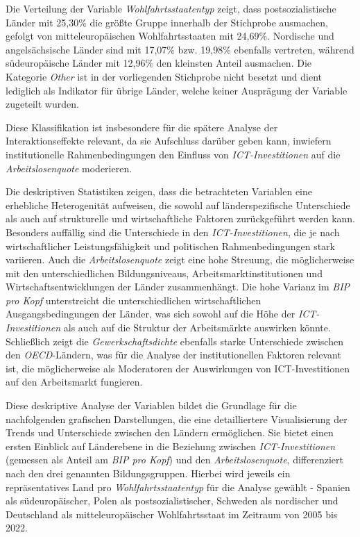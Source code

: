 

Die Verteilung der Variable \textit{Wohlfahrtsstaatentyp} zeigt, dass postsozialistische Länder 
mit 25,30\% die größte Gruppe innerhalb der Stichprobe ausmachen, gefolgt von mitteleuropäischen 
Wohlfahrtsstaaten mit 24,69\%. Nordische und angelsächsische Länder sind mit 17,07\% bzw. 19,98\% 
ebenfalls vertreten, während südeuropäische Länder mit 12,96\% den kleinsten Anteil ausmachen. 
Die Kategorie \textit{Other} ist in der vorliegenden Stichprobe nicht besetzt und dient lediglich 
als Indikator für übrige Länder, welche keiner Ausprägung der Variable zugeteilt wurden.

Diese Klassifikation ist insbesondere für die spätere Analyse der Interaktionseffekte relevant, 
da sie Aufschluss darüber geben kann, inwiefern institutionelle Rahmenbedingungen den Einfluss 
von \textit{\ac{ICT}-Investitionen} auf die \textit{Arbeitslosenquote} moderieren.

Die deskriptiven Statistiken zeigen, dass die betrachteten Variablen eine erhebliche 
Heterogenität aufweisen, die sowohl auf länderspezifische Unterschiede als auch auf strukturelle 
und wirtschaftliche Faktoren zurückgeführt werden kann. Besonders auffällig sind die Unterschiede 
in den \textit{\ac{ICT}-Investitionen}, die je nach wirtschaftlicher Leistungsfähigkeit und 
politischen Rahmenbedingungen stark variieren. Auch die \textit{Arbeitslosenquote} zeigt eine 
hohe Streuung, die möglicherweise mit den unterschiedlichen Bildungsniveaus, 
Arbeitsmarktinstitutionen und Wirtschaftsentwicklungen der Länder zusammenhängt. Die hohe Varianz 
im \textit{\ac{BIP} pro Kopf} unterstreicht die unterschiedlichen wirtschaftlichen 
Ausgangsbedingungen der Länder, was sich sowohl auf die Höhe der \textit{\ac{ICT}-Investitionen} 
als auch auf die Struktur der Arbeitsmärkte auswirken könnte. Schließlich zeigt die 
\textit{Gewerkschaftsdichte} ebenfalls starke Unterschiede zwischen den \textit{OECD}-Ländern, 
was für die Analyse der institutionellen Faktoren relevant ist, die möglicherweise als 
Moderatoren der Auswirkungen von \ac{ICT}-Investitionen auf den Arbeitsmarkt fungieren.

Diese deskriptive Analyse der Variablen bildet die Grundlage für die nachfolgenden grafischen 
Darstellungen, die eine detailliertere Visualisierung der Trends und Unterschiede zwischen den 
Ländern ermöglichen. Sie bietet einen ersten Einblick auf Länderebene in die Beziehung zwischen 
\textit{\ac{ICT}-Investitionen} (gemessen als Anteil am \textit{\ac{BIP} pro Kopf}) und den 
\textit{Arbeitslosenquote}, differenziert nach den drei genannten Bildungsgruppen. Hierbei wird 
jeweils ein repräsentatives Land pro \textit{Wohlfahrtsstaatentyp} für die Analyse gewählt - 
Spanien als südeuropäischer, Polen als postsozialistischer, Schweden als nordischer und 
Deutschland als mitteleuropäischer Wohlfahrtsstaat im Zeitraum von 2005 bis 2022. 


